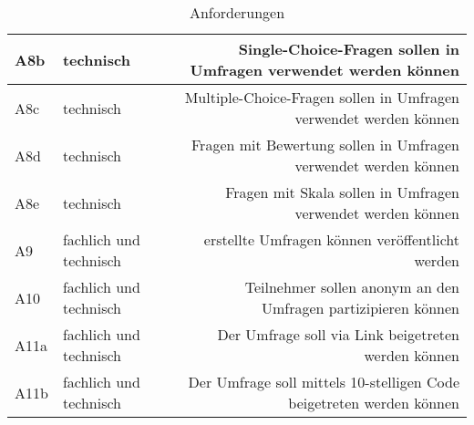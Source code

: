 \begin{table}[!htbp]
\begin{tabularx}{\textwidth}{l|k|r}
      \hline
      {\label{Anf:A8b}A8b} & technisch & Single-Choice-Fragen sollen in Umfragen verwendet werden können \\
      \hline
      {\label{Anf:A8c}A8c} & technisch & Multiple-Choice-Fragen sollen in Umfragen verwendet werden können \\
      \hline
      {\label{Anf:A8d}A8d} & technisch & Fragen mit Bewertung sollen in Umfragen verwendet werden können \\
      \hline
      {\label{Anf:A8e}A8e} & technisch & Fragen mit Skala sollen in Umfragen verwendet werden können \\
      \hline
      {\label{Anf:A9}A9} & fachlich und technisch & erstellte Umfragen können veröffentlicht werden \\
      \hline
      {\label{Anf:A10}A10} & fachlich und technisch & Teilnehmer sollen anonym an den Umfragen partizipieren können \\
      \hline
      {\label{Anf:A11a}A11a} & fachlich und technisch & Der Umfrage soll via Link beigetreten werden können \\
      \hline
      {\label{Anf:A11b}A11b} & fachlich und technisch & Der Umfrage soll mittels 10-stelligen Code beigetreten werden können \\
      \bottomrule
    \end{tabularx}
    \caption{Anforderungen}
    \label{tab:Anforderungen}
\end{table}
